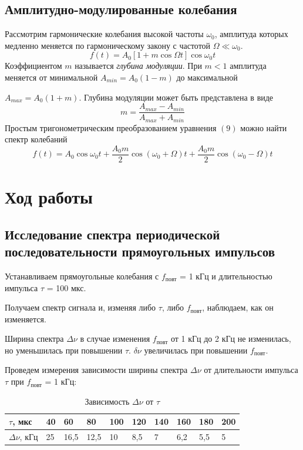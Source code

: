 \documentclass[a4paper, 12pt]{article}
\begin{document}
\subsection*{Амплитудно-модулированные колебания}
Рассмотрим гармонические колебания высокой частоты $\omega_0$, амплитуда которых медленно меняется по гармоническому закону с частотой $\Omega \ll \omega_0$.
\begin{equation}
f(t) = A_0 \left[1+m\cos \Omega t\right] \cos \omega_0 t
\end{equation}
Коэффициентом $m$ называется \textit{глубина модуляции}. При $m < 1$ амплитуда меняется от минимальной $A_{min} = A_0(1-m)$ до максимальной
 
$A_{max} = A_0(1+m)$. Глубина модуляции может быть представлена в виде
\begin{equation}
m = \dfrac{A_{max}-A_{min}}{A_{max}+A_{min}}
\end{equation}
Простым тригонометрическим преобразованием уравнения $(9)$ можно найти спектр колебаний
\begin{equation}
f(t) = A_0 \cos \omega_0t + \dfrac{A_0m}{2} \cos \left(\omega_0 + \Omega\right)t + \dfrac{A_0m}{2}\cos\left(\omega_0 - \Omega\right)t
\end{equation}

\section{Ход работы}
\subsection*{Исследование спектра периодической последовательности прямоугольных импульсов}

Устанавливаем прямоугольные колебания с $f_\text{повт}$ = 1 кГц и длительностью импульса $\tau$ = 100 мкс.

Получаем спектр сигнала и, изменяя либо $\tau$, либо $f_\text{повт}$, наблюдаем, как он изменяется.

Ширина спектра $\Delta \nu$ в случае изменения $f_\text{повт}$ от 1 кГц до 2 кГц не изменилась, но уменьшилась при повышении $\tau$. $\delta \nu$ увеличилась при повышении $f_\text{повт}$.

Проведем измерения зависимости ширины спектра $\Delta \nu$ от длительности импульса $\tau$ при $f_\text{повт}$ = 1 кГц:

\begin{table}[h!]
\caption{Зависимость $\Delta \nu$ от $\tau$}
\begin{tabular}{|l|l|l|l|l|l|l|l|l|l|}
\hline
$\tau$, мкс  & 40 & 60   & 80   & 100 & 120 & 140 & 160 & 180 & 200 \\ \hline
$\Delta \nu$, кГц & 25 & 16,5 & 12,5 & 10  & 8,5 & 7   & 6,2 & 5,5 & 5   \\ \hline
\end{tabular}
\end{table}
\end{document}
